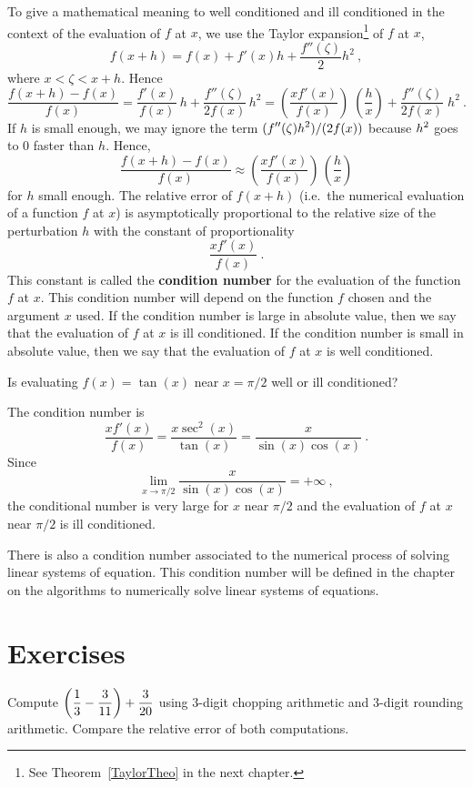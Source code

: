 To give a mathematical meaning to well conditioned and
ill conditioned in the context of the evaluation of $f$ at $x$,
we use the Taylor expansion\footnote{See Theorem~\ref{TaylorTheo} in
the next chapter.} of $f$ at $x$,
\[
f(x+h) = f(x) + f'(x)h + \frac{f''(\zeta)}{2}h^2 \ ,
\]
where $x < \zeta < x+h$.  Hence
\[
\frac{f(x+h)-f(x)}{f(x)} = \frac{f'(x)}{f(x)}\, h +
\frac{f''(\zeta)}{2f(x)}\, h^2
= \left( \frac{xf'(x)}{f(x)}\right)\; \left( \frac{h}{x} \right)
+ \frac{f''(\zeta)}{2f(x)}\; h^2 \ .
\]
If $h$ is small enough, we may ignore the term
$\displaystyle (f''(\zeta)h^2)/(2f(x))$ because
$\displaystyle h^2$ goes to $0$ faster than $h$.
Hence,
\[
\frac{f(x+h)-f(x)}{f(x)} \approx
\left( \frac{xf'(x)}{f(x)}\right)\, \left( \frac{h}{x} \right)
\]
for $h$ small enough.  The relative error of $f(x+h)$ (i.e.\ the numerical
evaluation of a function $f$ at $x$) is asymptotically proportional to
the relative size of the perturbation $h$ with the constant of
proportionality
\[
\frac{xf'(x)}{f(x)} \ .
\]
This constant is called the
{\bfseries condition number} for the
evaluation of the function $f$ at $x$.  This condition number will
depend on the function $f$ chosen and the argument $x$ used.  If the
condition number is large in absolute value, then we say that the
evaluation of $f$ at $x$ is ill conditioned.  If the condition number
is small in absolute value, then we say that the evaluation of $f$ at
$x$ is well conditioned.

\begin{egg}
Is evaluating $f(x)= \tan(x)$ near $x=\pi/2$ well or ill conditioned?

The condition number is
\[
\frac{xf'(x)}{f(x)} = \frac{x\sec^2(x)}{\tan(x)} =
\frac{x}{\sin(x)\cos(x)} \ .
\]
Since
\[
\lim_{x\rightarrow \pi/2} \frac{x}{\sin(x)\cos(x)} = +\infty \ ,
\]
the conditional number is very large for $x$ near $\pi/2$ and the
evaluation of $f$ at $x$ near $\pi/2$ is ill conditioned.
\end{egg}

There is also a condition number associated to the numerical process of
solving linear systems of equation.  This condition number will be
defined in the chapter on the algorithms to numerically solve linear
systems of equations.

\section{Exercises}

\begin{question}
Compute $\displaystyle \left(\frac{1}{3}-\frac{3}{11}\right) + \frac{3}{20}$
using $3$-digit chopping arithmetic and $3$-digit rounding arithmetic.
Compare the relative error of both computations.
\end{question}

